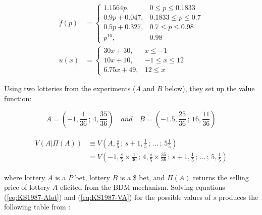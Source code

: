 \documentclass[../main.tex]{subfiles}
\begin{document}
\begin{align}
	f(p) &= 
	\begin{cases} 
		1.1564 p,     & 0 \leq p \leq 0.1833 \\
		0.9p + 0.047, & 0.1833 \leq p \leq 0.7 \\
		0.5p + 0.327, & 0.7 \leq p \leq 0.98 \\
		p^10,         & 0.98
	\end{cases}\label{eq:KS1987-pw}\\
	u(x) &= 
	\begin{cases} 
		30x + 30,     & x \leq -1 \\
		10x + 10,     & -1 \leq x \leq 12 \\
		6.75x + 49,   & 12 \leq x
	\end{cases}\label{eq:KS1987-ux}
\end{align}

Using two lotteries from the \textcite{Grether1979} experiments ($A$ and $B$ below), they set up the value function:

\begin{equation}
	\label{eq:KS1987-Alot}
	A = ( -1, \frac{1}{36} \,;\, 4, \frac{35}{36}) \quad \textit{and} \quad B=(-1.5, \frac{25}{36} \,;\, 16, \frac{11}{36})
\end{equation}

\begin{align}
	\label{eq:KS1987-VA}
	\begin{split}
		V(A|\Pi(A)) &\equiv V \left( A,\frac{s}{5} \,;\, s+1, \frac{1}{5} \,;\, \ldots \,;\, 5 \frac{1}{5} \right)\\
		            &=      V \left(-1,\frac{s}{5} \times \frac{1}{36} \,;\, 4, \frac{s}{5}\times \frac{35}{36} \,;\, s+1, \frac{1}{5} \,;\, \ldots \,;\, 5,\frac{1}{5}  \right)
	\end{split}
\end{align}

\noindent where lottery $A$ is a $P$ bet, lottery $B$ is a {\$} bet, and $\Pi(A)$ returns the selling price of lottery $A$ elicited from the BDM mechanism.
Solving equations (\ref{eq:KS1987-Alot}) and (\ref{eq:KS1987-VA}) for the possible values of $s$ produces the following table from \textcite[679]{Karni1987}:
\end{document}
